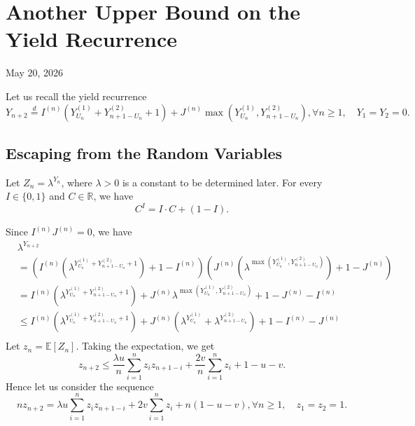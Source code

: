 \chapter{Another Upper Bound on the Yield Recurrence}

\begin{center}
  May 20, 2026
  \vspace{0.5cm}
\end{center}

Let us recall the yield recurrence
$$Y_{n+2} \stackrel{d}{=} I^{(n)}\left(Y_{U_n}^{(1)} + Y_{n+1-U_n}^{(2)} + 1\right) + J^{(n)}\max\left(Y_{U_n}^{(1)}, Y_{n+1-U_n}^{(2)}\right),\forall n \geq 1, \quad Y_1 = Y_2 = 0.$$

\section{Escaping from the Random Variables}

Let $Z_n = \lambda^{Y_n}$, where $\lambda > 0$ is a constant to be determined later. For every $I\in \{0,1\}$ and $C\in \mathbb{R}$, we have
$$C^I = I\cdot C + (1-I).$$

Since $I^{(n)}J^{(n)}=0$, we have
\begin{align*}
   & \lambda^{Y_{n+2}}                                                                                                                                                                           \\
   & = \left(I^{(n)}\left(\lambda^{Y_{U_n}^{(1)} + Y_{n+1-U_n}^{(2)} + 1}\right) + 1-I^{(n)}\right)\left(J^{(n)}\left(\lambda^{\max(Y_{U_n}^{(1)}, Y_{n+1-U_n}^{(2)})}\right) + 1-J^{(n)}\right) \\
   & = I^{(n)}\left(\lambda^{Y_{U_n}^{(1)} + Y_{n+1-U_n}^{(2)} + 1}\right) + J^{(n)}\lambda^{\max\left(Y_{U_n}^{(1)}, Y_{n+1-U_n}^{(2)}\right)} + 1 - J^{(n)} - I^{(n)}                          \\
   & \le I^{(n)}\left(\lambda^{Y_{U_n}^{(1)} + Y_{n+1-U_n}^{(2)} + 1}\right) + J^{(n)}\left(\lambda^{Y_{U_n}^{(1)}}+ \lambda^{Y_{n+1-U_n}^{(2)}}\right) + 1  - I^{(n)} - J^{(n)}                 \\
\end{align*}
Let $z_n = \mathbb{E}[Z_n]$. Taking the expectation, we get
$$z_{n+2} \le \dfrac{\lambda u}{n}\sum\limits_{i=1}^n z_iz_{n+1-i} + \dfrac{2v}{n}\sum\limits_{i=1}^n z_i + 1-u-v.$$
Hence let us consider the sequence
\begin{equation}
  \label{eq:upper_bound_z}
  nz_{n+2} = \lambda u\sum\limits_{i=1}^n z_iz_{n+1-i} + 2v\sum\limits_{i=1}^n z_i + n(1-u-v), \forall n\ge 1, \quad z_1=z_2=1.
\end{equation}

